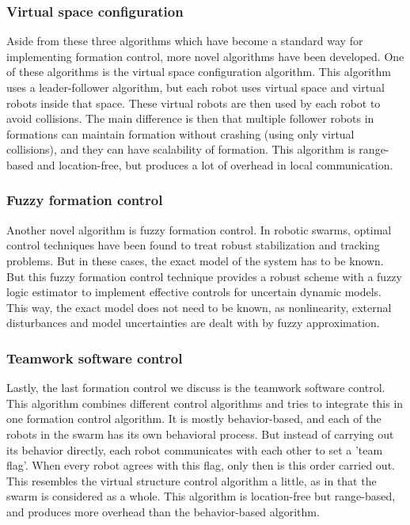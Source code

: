 \subsubsection{Virtual space configuration}
Aside from these three algorithms which have become a standard way for implementing formation control, more novel algorithms have been developed. 
One of these algorithms is the virtual space configuration algorithm. \cite{wee2013formation}
This algorithm uses a leader-follower algorithm, but each robot uses virtual space and virtual robots inside that space.
These virtual robots are then used by each robot to avoid collisions. 
The main difference is then that multiple follower robots in formations can maintain formation without crashing (using only virtual collisions), and they can have scalability of formation. 
This algorithm is range-based and location-free, but produces a lot of overhead in local communication.

\subsubsection{Fuzzy formation control}
Another novel algorithm is fuzzy formation control.\cite{ranjbar2012novel}
In robotic swarms, optimal control techniques have been found to treat robust stabilization and tracking problems. 
But in these cases, the exact model of the system has to be known. 
But this fuzzy formation control technique provides a robust scheme with a fuzzy logic estimator to implement effective controls for uncertain dynamic models.
This way, the exact model does not need to be known, as nonlinearity, external disturbances and model uncertainties are dealt with by fuzzy approximation.

\subsubsection{Teamwork software control}
Lastly, the last formation control we discuss is the teamwork software control. \cite{kaminka2013use}
This algorithm combines different control algorithms and tries to integrate this in one formation control algorithm.
It is mostly behavior-based, and each of the robots in the swarm has its own behavioral process. 
But instead of carrying out its behavior directly, each robot communicates with each other to set a 'team flag'. 
When every robot agrees with this flag, only then is this order carried out. 
This resembles the virtual structure control algorithm a little, as in that the swarm is considered as a whole. 
This algorithm is location-free but range-based, and produces more overhead than the behavior-based algorithm.

